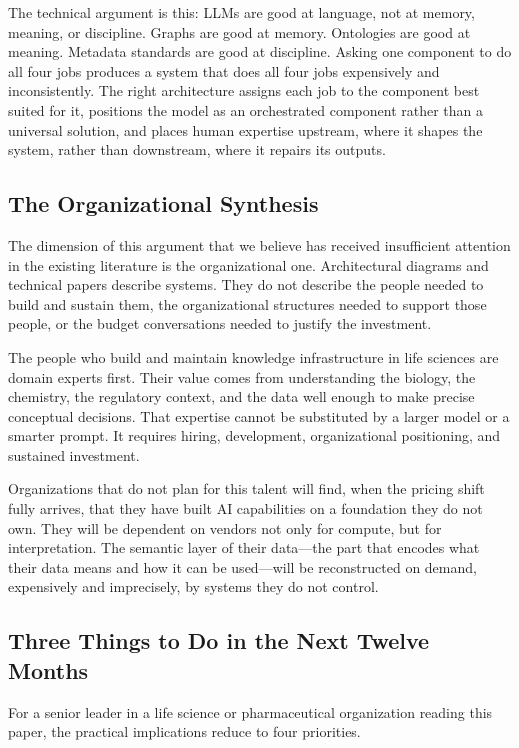 \documentclass[man,12pt,donotrepeattitle]{apa7}
\begin{document}
The technical argument is this: LLMs are good at language, not at memory,
meaning, or discipline. Graphs are good at memory. Ontologies are good at
meaning. Metadata standards are good at discipline. Asking one component to
do all four jobs produces a system that does all four jobs expensively and
inconsistently. The right architecture assigns each job to the component
best suited for it, positions the model as an orchestrated component rather
than a universal solution, and places human expertise upstream, where it
shapes the system, rather than downstream, where it repairs its outputs.

\subsection{The Organizational Synthesis}

The dimension of this argument that we believe has received insufficient
attention in the existing literature is the organizational one.
Architectural diagrams and technical papers describe systems. They do not
describe the people needed to build and sustain them, the organizational
structures needed to support those people, or the budget conversations needed
to justify the investment.

The people who build and maintain knowledge infrastructure in life sciences
are domain experts first. Their value comes from understanding the biology,
the chemistry, the regulatory context, and the data well enough to make
precise conceptual decisions. That expertise cannot be substituted by a
larger model or a smarter prompt. It requires hiring, development,
organizational positioning, and sustained investment.

Organizations that do not plan for this talent will find, when the pricing
shift fully arrives, that they have built AI capabilities on a foundation
they do not own. They will be dependent on vendors not only for compute, but
for interpretation. The semantic layer of their data---the part that encodes
what their data means and how it can be used---will be reconstructed on
demand, expensively and imprecisely, by systems they do not control.

\subsection{Three Things to Do in the Next Twelve Months}

For a senior leader in a life science or pharmaceutical organization reading
this paper, the practical implications reduce to four priorities.
\end{document}
